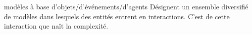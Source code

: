\documentclass[newPxFont]{beamer}
\begin{document}
\begin{frame}[c]{modèles à base d’objets/d’événements/d’agents}
  \vspace{-2em}
  Désignent un ensemble diversifié de modèles dans lesquels des entités entrent en interactions. C'est de cette interaction que naît la complexité.
  \begin{figure}
   	\centering
   		\hspace{0.2em} %
      \hspace{0.2em} %
  \end{figure}

\end{frame}
\end{document}
